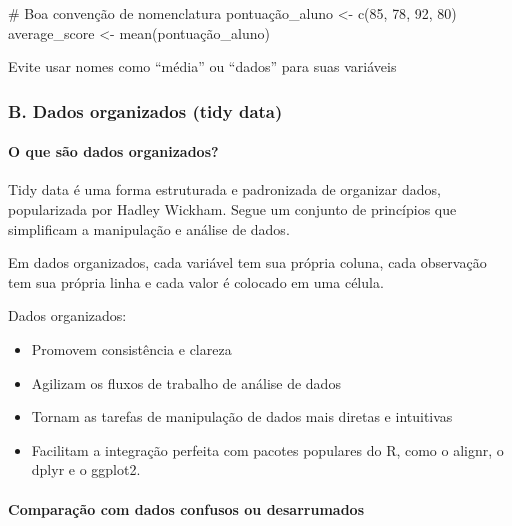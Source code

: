 \documentclass[
  letterpaper,
  DIV=11,
  numbers=noendperiod]{scrartcl}
\let\oldparagraph\paragraph
\renewcommand{\paragraph}[1]{\oldparagraph{#1}\mbox{}}
\newenvironment{Shaded}{\begin{snugshade}}{\end{snugshade}}
\newcommand{\CommentTok}[1]{\textcolor[rgb]{0.37,0.37,0.37}{#1}}
\newcommand{\DecValTok}[1]{\textcolor[rgb]{0.68,0.00,0.00}{#1}}
\newcommand{\FunctionTok}[1]{\textcolor[rgb]{0.28,0.35,0.67}{#1}}
\newcommand{\NormalTok}[1]{\textcolor[rgb]{0.00,0.23,0.31}{#1}}
\newcommand{\OtherTok}[1]{\textcolor[rgb]{0.00,0.23,0.31}{#1}}
\begin{document}
\begin{Shaded}
\begin{Highlighting}[]
\CommentTok{\# Boa convenção de nomenclatura}
\NormalTok{pontuação\_aluno }\OtherTok{\textless{}{-}} \FunctionTok{c}\NormalTok{(}\DecValTok{85}\NormalTok{, }\DecValTok{78}\NormalTok{, }\DecValTok{92}\NormalTok{, }\DecValTok{80}\NormalTok{)}
\NormalTok{average\_score }\OtherTok{\textless{}{-}} \FunctionTok{mean}\NormalTok{(pontuação\_aluno)}
\end{Highlighting}
\end{Shaded}

Evite usar nomes como ``média'' ou ``dados'' para suas variáveis

\hypertarget{b.-dados-organizados-tidy-data}{%
\subsubsection{B. Dados organizados (tidy
data)}\label{b.-dados-organizados-tidy-data}}

\hypertarget{o-que-suxe3o-dados-organizados}{%
\paragraph{O que são dados
organizados?}\label{o-que-suxe3o-dados-organizados}}

Tidy data é uma forma estruturada e padronizada de organizar dados,
popularizada por Hadley Wickham. Segue um conjunto de princípios que
simplificam a manipulação e análise de dados.

Em dados organizados, cada variável tem sua própria coluna, cada
observação tem sua própria linha e cada valor é colocado em uma célula.

Dados organizados:

\begin{itemize}
\item
  Promovem consistência e clareza
\item
  Agilizam os fluxos de trabalho de análise de dados
\item
  Tornam as tarefas de manipulação de dados mais diretas e intuitivas
\item
  Facilitam a integração perfeita com pacotes populares do R, como o
  alignr, o dplyr e o ggplot2.
\end{itemize}

\hypertarget{comparauxe7uxe3o-com-dados-confusos-ou-desarrumados}{%
\paragraph{Comparação com dados confusos ou
desarrumados}\label{comparauxe7uxe3o-com-dados-confusos-ou-desarrumados}}
\end{document}

